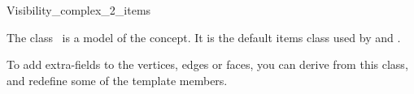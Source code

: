 
\ccRefPageBegin


\begin{ccRefClass}{Visibility_complex_2_items}

\ccDefinition
  
The class \ccRefName\ is a model of the 
concept.  It is the default items class used by
 and
.

To add extra-fields to the vertices, edges or faces, you can derive from
this class, and redefine some of the template members.


\ccIsModel
{}

\ccSeeAlso
{}

\end{ccRefClass}
\ccRefPageEnd
